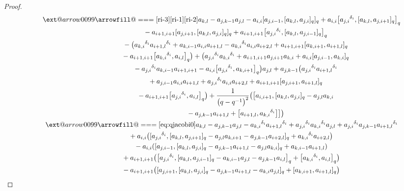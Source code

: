 \documentclass[10pt,a4paper]{amsart}
\makeatletter
\def\x@arrow{\DOTSB\Relbar}
\def\xlongequalsignfill@{\arrowfill@\x@arrow\Relbar\x@arrow}
\providecommand{\xlongequal}[2][]{%
	\ext@arrow 0099\xlongequalsignfill@{#1}{#2}}
\numberwithin{equation}{section}
\def\d{\delta}
\makeatother
\begin{document}
\begin{proof}
\begin{gather*}
\qquad \xlongequal[\eqref{ri-3}]{\substack{{\eqref{ri-1}\eqref{ri-2}}}} a_{k,l} -a_{j,k-1}a_{j,l}-a_{i,i} [a_{j,i-1}, [a_{k,l},a_{j,i} ]_q ]_q+ a_{i,i} \bigl[{a_{j,i}}^{\d_i}, [a_{k,l},a_{j,i+1} ]_q \bigr]_q \\
 \qquad\qquad\qquad {}-a_{i+1,i+1} [a_{j,i+1}, [a_{k,l},a_{j,i} ]_q ]_q +a_{i+1,i+1} \bigl[{a_{j,i}}^{\d_i}, [a_{k,l},a_{j,i-1} ]_q \bigr]_q \\
 \qquad\qquad \qquad{}- \bigl({a_{k,i}}^{\d_i}{a_{i+1,l}}^{\d_i} +a_{k,i-1}a_{i,i}a_{i+1,l}-{a_{k,i}}^{\d_i}a_{i,i}a_{i+2,l} +a_{i+1,i+1} [a_{k,i+1},a_{i+1,l} ]_q \\
 \qquad\qquad\qquad {}-a_{i+1,i+1} \bigl[{a_{k,i}}^{\d_i},a_{i,l} \bigr]_q \bigr) + \bigl({a_{j,i}}^{\d_i}{a_{k,i}}^{\d_i}+a_{i+1,i+1}a_{j,i+1}a_{k,i} +a_{i,i} [a_{j,i-1},a_{k,i} ]_q \\
 \qquad\qquad \qquad {}-{a_{j,i}}^{\d_i}a_{k,i-1}a_{i+1,i+1} -a_{i,i} \bigl[{a_{j,i}}^{\d_i}, a_{k,i+1} \bigr]_q \bigr)a_{j,l} +a_{j,k-1} \bigl({a_{j,i}}^{\d_i}{a_{i+1,l}}^{\d_i} \\
 \qquad\qquad \qquad {}+a_{j,i-1}a_{i,i}a_{i+1,l}+{a_{j,i}}^{\d_i}a_{i,i}a_{i+2,l} +a_{i+1,i+1} [a_{j,i+1},a_{i+1,l} ]_q\\
 \qquad\qquad \qquad{}-a_{i+1,i+1} \bigl[{a_{j,i}}^{\d_i},a_{i,l} \bigr]_q \bigr) +\frac{1}{\bigl(q-q^{-1}\bigr)^2} \bigl( \bigl[a_{i,i+1}, [a_{k,l},a_{j,i} ]_q -a_{j,l}a_{k,i}\\
 \qquad\qquad \qquad{}-a_{j,k-1}a_{i+1,l} + \bigl[a_{i+1,l},{a_{k,i}}^{\d_i} \bigr] \bigr] \bigr)\\
\qquad \xlongequal{\eqref{eq:qjacobi0} } a_{k,l}-a_{j,k-1}a_{j,l}-{a_{k,i}}^{\d_i}{a_{i+1,l}}^{\d_i} +{a_{j,i}}^{\d_i}{a_{k,i}}^{\d_i}a_{j,l}+{a_{j,i}}^{\d_i}a_{j,k-1}{a_{i+1,l}}^{\d_i}\\
 \qquad\qquad\ \ {}+a_{i,i} \bigl( [{a_{j,i}}^{\d_i}, [a_{k,l},a_{j,i+1} ]_q -a_{j,l}a_{k,i+1} -a_{j,k-1}a_{i+2,l} ]_q+{a_{k,i}}^{\d_i}a_{i+2,l} \bigr)\\
 \qquad\qquad\ \ {}-a_{i,i} ( [a_{j,i-1}, [a_{k,l},a_{j,i} ]_q -a_{j,k-1}a_{i+1,l} -a_{j,l}a_{k,i} ]_q+a_{k,i-1}a_{i+1,l} )\\
 \qquad\qquad\ \ {}+a_{i+1,i+1} \bigl( \bigl[{a_{j,i}}^{\d_i}, [a_{k,l},a_{j,i-1} ]_q -a_{k,i-1}a_{j,l}-a_{j,k-1}a_{i,l} \bigr]_q+ \bigl[{a_{k,i}}^{\d_i},a_{i,l} \bigr]_q \bigr)\\
\qquad\qquad \ \ {}-a_{i+1,i+1} \bigl( [a_{j,i+1}, [a_{k,l},a_{j,i} ]_q -a_{j,k-1}a_{i+1,l}-a_{k,i}a_{j,l} ]_q + [a_{k,i+1},a_{i+1,l} ]_q \bigr)\\

\end{gather*}
\end{proof}
\end{document}
